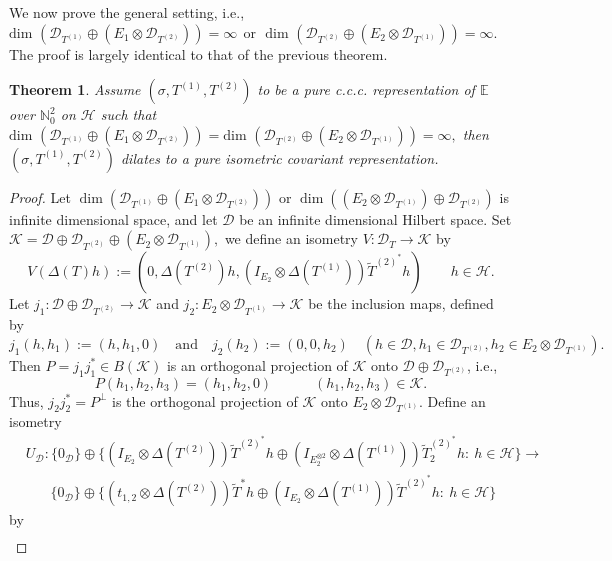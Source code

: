 \documentclass[12pt]{amsart}
\numberwithin{equation}{section}
\theoremstyle{plain}
\newtheorem{theorem}{Theorem}[section]
\newcommand{\raro}{\rightarrow}
\newcommand{\be}{\mathbb E}
\newcommand{\ot}{\otimes}
\newcommand{\wt}{\widetilde}
\newcommand{\wT}{\wt{T}}
\begin{document}
We now prove the general setting, i.e., $\mbox{dim~} (\mathcal{D}_{T^{(1)}} \oplus (E_1 \ot\mathcal{D}_{ T^{(2)}}))= \infty ~~\mbox{or}~~~\mbox{dim~} (\mathcal{D}_{ T^{(2)}}\oplus (E_2\ot \mathcal{D}_{ T^{(1)}}))= \infty.$ The proof is largely identical to that of the previous theorem.

	\begin{theorem}\label{DSAR4}
	Assume $(\sigma, T^{(1)}, T^{(2)})$ to be a pure c.c.c. representation of $\be$ over $\mathbb N^2_0$ on $\mathcal H$ such that $\mbox{dim~} (\mathcal{D}_{T^{(1)}} \oplus (E_1 \ot\mathcal{D}_{ T^{(2)}}))=\mbox{dim~} (\mathcal{D}_{ T^{(2)}}\oplus (E_2\ot \mathcal{D}_{ T^{(1)}}))= \infty,$ then $(\sigma, T^{(1)}, T^{(2)})$ dilates to a pure isometric covariant representation.
\end{theorem}
\begin{proof}
	Let $ \dim (\mathcal{D}_{T^{(1)}} \oplus  (E_1 \ot\mathcal{D}_{T^{(2)}}))$ or $\dim ((E_2 \ot \mathcal{D}_{T^{(1)}}) \oplus  \mathcal{D}_{T^{(2)}} )$ is infinite dimensional space, and let $\mathcal{D}$ be an infinite dimensional
	Hilbert space. Set $\mathcal K= \mathcal{D} \oplus \mathcal{D}_{T^{(2)}} \oplus(E_2 \ot\mathcal{D}_{T^{(1)}}),$ we define an isometry $V:\mathcal{D}_{T}\to  \mathcal K$ by
	$$V(\Delta(T)h):=(0,\Delta(T^{(2)})h,  (I_{E_2} \ot \Delta(T^{(1)}))\wT^{(2)^*}h)\quad \quad h\in \mathcal{H}.$$
	Let $j_1 : \mathcal{D}\oplus \mathcal{D}_{T^{(2)}} \raro \mathcal{K}$ and $j_2 :  E_2 \ot\mathcal{D}_{ T^{(1)}} \raro \mathcal{K}$ be
	the inclusion maps, defined by
	\[
	j_1(h,h_1) := (h,h_1,0)\quad  \mbox{and} \quad j_2 (h_2) := (0,0,h_2)
	\quad (h\in \mathcal{D},h_1 \in \mathcal{D}_{T^{(2)}}, h_2 \in  E_2 \ot\mathcal{D}_{ T^{(1)}}).
	\]
	Then $P= j_1 j_1^* \in B(\mathcal{K})$ is an orthogonal
	projection of $\mathcal{K}$ onto $\mathcal{D}\oplus \mathcal{D}_{ T^{(2)}}$, i.e.,
	\[
	P(h_1,h_2,h_3) = (h_1,h_2,0) \quad \quad \quad (h_1,h_2,h_3) \in \mathcal{K}.
	\]
	Thus, $j_2 j_2^* = P^\perp$ is the orthogonal projection of $\mathcal{K}$
	onto $E_2 \ot\mathcal{D}_{ T^{(1)}}.$
	Define an isometry
	 \begin{align*}&
		U_{\mathcal{D}}: \{0_\mathcal{D}\}\oplus \{(I_{E_2} \ot \Delta(T^{(2)}))\wT^{(2)^*}h\oplus (I_{E_2^{\ot 2}} \ot \Delta(T^{(1)}))\wT_2^{(2)^*}h:~h\in \mathcal H\} \to \\& \:\:\:\:\:\:\:\: \{0_\mathcal{D}\}\oplus \{(t_{1,2}\ot \Delta(T^{(2)}))\wT^{*}h\oplus (I_{E_2}\ot \Delta(T^{(1)}))\wT^{(2)^*}h:~h\in \mathcal H\} 
	\end{align*} by 
	\begin{align*}&

\end{align*}
\end{proof}
\end{document}
